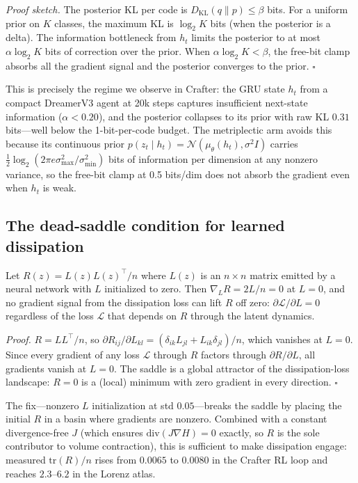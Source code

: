 \textit{Proof sketch.} The posterior KL per code is
$D_{\mathrm{KL}}(q \| p) \leq \beta$ bits. For a uniform prior on $K$
classes, the maximum KL is $\log_2 K$ bits (when the posterior is a delta).
The information bottleneck from $h_t$ limits the posterior to at most
$\alpha \log_2 K$ bits of correction over the prior. When
$\alpha \log_2 K < \beta$, the free-bit clamp absorbs all the gradient
signal and the posterior converges to the prior. \hfill$\square$

This is precisely the regime we observe in Crafter: the GRU state $h_t$
from a compact DreamerV3 agent at 20k steps captures insufficient
next-state information ($\alpha < 0.20$), and the posterior collapses to
its prior with raw KL $0.31$ bits---well below the 1-bit-per-code budget.
The metriplectic arm avoids this because its continuous prior
$p(z_t \mid h_t) = \mathcal{N}(\mu_\theta(h_t), \sigma^2 I)$ carries
$\frac{1}{2}\log_2(2\pi e \sigma_{\max}^2/\sigma_{\min}^2)$ bits of
information per dimension at any nonzero variance, so the free-bit clamp
at 0.5 bits/dim does not absorb the gradient even when $h_t$ is weak.

\subsection{The dead-saddle condition for learned dissipation}

\begin{proposition}[Dead saddle for $R = LL^\top$]\label{prop:saddle}
Let $R(z) = L(z) L(z)^\top / n$ where $L(z)$ is an $n \times n$ matrix
emitted by a neural network with $L$ initialized to zero. Then
$\nabla_L R = 2 L / n = 0$ at $L = 0$, and no gradient signal from the
dissipation loss can lift $R$ off zero: $\partial \mathcal{L}/\partial L
= 0$ regardless of the loss $\mathcal{L}$ that depends on $R$ through
the latent dynamics.
\end{proposition}

\textit{Proof.} $R = LL^\top/n$, so
$\partial R_{ij}/\partial L_{kl} = (\delta_{ik} L_{jl} + L_{ik}
\delta_{jl})/n$, which vanishes at $L=0$. Since every gradient of any
loss $\mathcal{L}$ through $R$ factors through $\partial R / \partial L$,
all gradients vanish at $L=0$. The saddle is a global attractor of the
dissipation-loss landscape: $R=0$ is a (local) minimum with zero
gradient in every direction. \hfill$\square$

The fix---nonzero $L$ initialization at std $0.05$---breaks the saddle
by placing the initial $R$ in a basin where gradients are nonzero.
Combined with a constant divergence-free $J$ (which ensures $\mathrm{div}
(J \nabla H) = 0$ exactly, so $R$ is the sole contributor to volume
contraction), this is sufficient to make dissipation engage: measured
$\mathrm{tr}(R)/n$ rises from $0.0065$ to $0.0080$ in the Crafter RL
loop and reaches $2.3$--$6.2$ in the Lorenz atlas.

